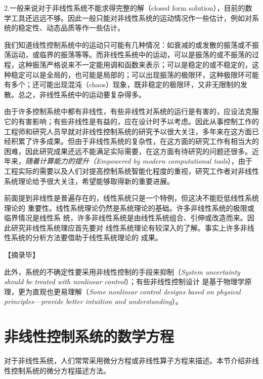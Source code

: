 2.一般来说对于非线性系统不能求得完整的解（closed form solution），目前的数学工具还远远不够。因此一般只能对非线性系统的运动情况作一些估计，例如对系统的稳定性、动态品质等作一些估计。

我们知道线性控制系统中的运动只可能有几种情况：如衰减的或发散的振荡或不振荡运动，或临界的振荡等等。而非线性系统中的运动，可以是振荡的或不振荡的过程，这种振荡严格说来不一定能用调和函数来表示；可以是稳定的或不稳定的，这种稳定可以是全局的，也可能是局部的；可以出现振荡的极限环，这种极限环可能有多个；还可能出现混沌（chaos）现象，既非稳定的极限环，又非无限制的发散。总之，非线性系统中的运动要复杂得多。

由于许多控制系统中都有非线性，有些非线性对系统的运行是有害的，应设法克服它的有害影响；有些非线性是有益的，应在设计时予以考虑。因此从事控制工作的工程师和研究人员早就对非线性控制系统的研究予以很大关注，多年来在这方面已经积累了许多成果。但由于非线性系统的复杂性，在这方面的研究工作有相当大的困难，因此研究成果还远不能满足实际需要，在这方面有待研究的问题还很多。近年来，{\it 随着计算能力的提升（Empowered by modern computational tools}），由于工程实际的需要以及人们对提高控制系统智能化程度的重视，研究工作者对非线性系统理论给予很大关注，希望能够取得新的重要进展。

前面提到非线性是普遍存在的，线性系统只是一个特例，但这决不能贬低线性系统理论的
重要性。线性系统理论仍然是系统理论的基础。许多非线性系统的极限或临界情况是线性系
统，许多非线性系统是由线性系统组合、引伸或改造而来。因此研究非线性系统理应首先要对
线性系统理论有较深入的了解。事实上许多非线性系统的分析方法要借助于线性系统理论的
成果。

【摘录毕】

此外，系统的不确定性要采用非线性控制的手段来抑制（{\it System uncertainty should be treated with nonlinear control}）；有些非线性控制设计
是基于物理学原理，更为直观也更易理解（{\it Some nonlinear control designs based on physical principles---provide
better intuition and understanding}）。


\section{非线性控制系统的数学方程}\label{1Bref}

对于非线性系统，人们常常采用微分方程或非线性算子方程来描述。本节介绍非线性控制系统的微分方程描述方法。

